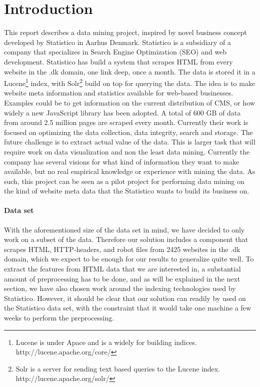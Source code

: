 \section{Introduction}
\label{sec:introduction}

This report describes a data mining project, inspired by novel business concept developed by Statistico in Aarhus Denmark. Statistico is a subsidiary of a company that specializes in Search Engine Optimization (SEO) and web development. Statistico has build a system that scrapes HTML from every website in the .dk domain, one link deep, once a month. The data is stored it in a Lucene\footnote{Lucene is under Apace and is a widely for building indices. http://lucene.apache.org/core/} index, with Solr\footnote{Solr is a server for sending text based queries to the Lucene index. http://lucene.apache.org/solr/} build on top for querying the data. The idea is to make website meta information and statistics available for web-based businesses. Examples could be to get information on the current distribution of CMS, or how widely a new JavaScript library has been adopted. A total of 600 GB of data from around 2.5 million pages are scraped every month. Currently their work is focused on optimizing the data collection, data integrity, search and storage.
The future challenge is to extract actual value of the data. This is larger task that will require work on data visualization and non the least data mining. Currently the company has several visions for what kind of information they want to make available, but no real empirical knowledge or experience with mining the data. As such, this project can be seen as a pilot project for performing data mining on the kind of website meta data that the Statistico wants to build its business on.

\paragraph{Data set}
\label{subsec:data_set}
With the aforementioned size of the data set in mind, we have decided to only work on a subset of the data. Therefore our solution includes a component that scrapes HTML, HTTP-headers, and robot files from 2425 websites in the .dk domain, which we expect to be enough for our results to generalize quite well. To extract the features from HTML data that we are interested in, a substantial amount of preprocessing has to be done, and as will be explained in the next section, we have also chosen work around the indexing technologies used by Statistico. However, it should be clear that our solution can readily by used on the Statistico data set, with the constraint that it would take one machine a few weeks to perform the preprocessing.

